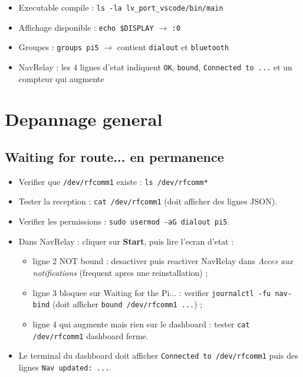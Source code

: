 \documentclass[a4paper,11pt]{article}
\begin{document}
\begin{itemize}
  \item[\checkmark] Executable compile : \texttt{ls -la lv\_port\_vscode/bin/main}
  \item[\checkmark] Affichage disponible : \texttt{echo \$DISPLAY} $\to$ \texttt{:0}
  \item[\checkmark] Groupes : \texttt{groups pi5} $\to$ contient \texttt{dialout} et \texttt{bluetooth}
  \item[\checkmark] NavRelay : les 4 lignes d'etat indiquent \texttt{OK}, \texttt{bound},
    \texttt{Connected to ...} et un compteur qui augmente
\end{itemize}

\section{Depannage general}

\subsection{\og Waiting for route...\fg{} en permanence}

\begin{itemize}
  \item Verifier que \texttt{/dev/rfcomm1} existe : \texttt{ls /dev/rfcomm*}
  \item Tester la reception : \texttt{cat /dev/rfcomm1} (doit afficher des lignes JSON).
  \item Verifier les permissions : \texttt{sudo usermod -aG dialout pi5}.
  \item Dans NavRelay : cliquer sur \textbf{Start}, puis lire l'ecran d'etat :
  \begin{itemize}
    \item ligne 2 \og NOT bound\fg{} : desactiver puis reactiver NavRelay dans
      \emph{Acces aux notifications} (frequent apres une reinstallation) ;
    \item ligne 3 bloquee sur \og Waiting for the Pi...\fg{} : verifier
      \texttt{journalctl -fu nav-bind} (doit afficher \texttt{bound /dev/rfcomm1 ...}) ;
    \item ligne 4 qui augmente mais rien sur le dashboard : tester \texttt{cat /dev/rfcomm1}
      dashboard ferme.
  \end{itemize}
  \item Le terminal du dashboard doit afficher \texttt{Connected to /dev/rfcomm1} puis des
    lignes \texttt{Nav updated: ...}.
\end{itemize}
\end{document}
